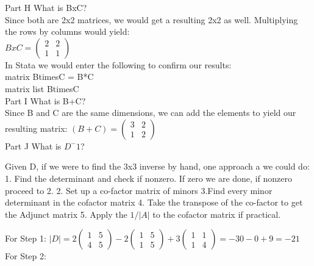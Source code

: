 \documentclass[11pt]{article}
\begin{document}
Part H What is BxC?\\

Since both are 2x2 matrices, we would get a resulting 2x2 as well. Multiplying the rows by columns would yield:\\

$ BxC= \left(\begin{smallmatrix} 2&2\\1&1 \end{smallmatrix} \right)$\\

In Stata we would enter the following to confirm our results:\\
matrix BtimesC = B*C\\
matrix list BtimesC\\

Part I What is B+C?\\

Since B and C are the same dimensions, we can add the elements to yield our resulting matrix:	$(B+C)= \left( \begin{smallmatrix} 3&2\\1&2 \end{smallmatrix} \right)$\\

Part J What is $D^-1$? 

Given D, if we were to find the 3x3 inverse by hand, one approach a we could do:
1. Find the determinant and check if nonzero. If zero we are done, if nonzero proceed to 2.
2. Set up a co-factor matrix of minors
3.Find every minor determinant in the cofactor matrix
4. Take the transpose of the co-factor to get the Adjunct matrix 
5. Apply the $1/|A|$ to the cofactor matrix if practical.

For Step 1: $|D|=2 \left( \begin{smallmatrix} 1&5\\ 4&5 \end{smallmatrix} \right)-2 \left( \begin{smallmatrix}1&5\\1&5 \end{smallmatrix} \right) +3 \left( \begin{smallmatrix} 1&1\\1&4 \end{smallmatrix} \right) = -30-0+9= -21$\\

For Step 2:\\
\end{document}
